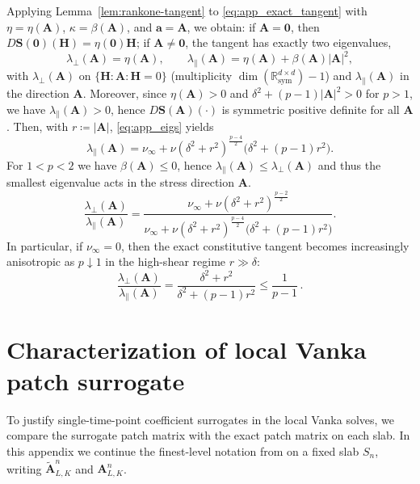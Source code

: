 \documentclass[DIV=16]{scrartcl}
\DeclareMathOperator{\sym}{sym}
\newcommand{\abs}[1]{\left\lvert #1\right\rvert}
\newcommand{\Sstress}{\boldsymbol S} %
\newcommand{\Sn}{S_n}
\newcommand{\reg}{\delta}
\newcommand{\pn}{p}
\newcommand{\etaeff}[1]{\eta \left(#1\right)}
\newcommand{\DStress}[2]{D\Sstress \left(#1\right) \left(#2\right)}
\begin{document}
Applying Lemma~\ref{lem:rankone-tangent} to \eqref{eq:app_exact_tangent} with
$\eta=\etaeff{\bm A}$, $\kappa=\beta(\bm A)$, and $\bm a=\bm A$, we obtain:
if $\bm A=\bm 0$, then $\DStress{\bm 0}{\bm H}=\etaeff{\bm 0}\bm H$; if $\bm A\neq \bm 0$,
the tangent has exactly two eigenvalues,
\begin{equation}\label{eq:app_eigs}
  \lambda_\perp(\bm A)=\etaeff{\bm A},
  \qquad
  \lambda_\parallel(\bm A)=\etaeff{\bm A}+\beta(\bm A)\abs{\bm A}^2,
\end{equation}
with $\lambda_\perp(\bm A)$ on $\{\bm H:\bm A:\bm H=0\}$ (multiplicity $\dim(\mathbb{R}^{d\times d}_{\sym})-1$)
and $\lambda_\parallel(\bm A)$ in the direction $\bm A$.
Moreover, since $\etaeff{\bm A}>0$ and $\reg^2+(\pn-1)\abs{\bm A}^2>0$ for $\pn>1$, we have
$\lambda_\parallel(\bm A)>0$, hence $\DStress{\bm A}{\cdot}$ is symmetric
positive definite for all $\bm A$.
Then, with $r\coloneq \abs{\bm A}$, \eqref{eq:app_eigs} yields
\[
  \lambda_\parallel(\bm A)
  =\nu_{\infty}+\nu(\reg^2+r^2)^{\frac{\pn-4}{2}}\bigl(\reg^2+(\pn-1)r^2\bigr).
\]
For $1<\pn < 2$ we have $\beta(\bm A)\le 0$, hence $\lambda_\parallel(\bm A)\le \lambda_\perp(\bm A)$ and
thus the smallest eigenvalue acts in the stress direction $\bm A$.
\begin{equation}\label{eq:app_ratio}
  \frac{\lambda_\perp(\bm A)}{\lambda_\parallel(\bm A)}
  =\frac{\nu_{\infty}+\nu(\reg^2+r^2)^{\frac{\pn-2}{2}}}
         {\nu_{\infty}+\nu(\reg^2+r^2)^{\frac{\pn-4}{2}}\bigl(\reg^2+(\pn-1)r^2\bigr)}.
\end{equation}
In particular, if $\nu_{\infty}=0$, then the exact constitutive tangent becomes increasingly anisotropic as $\pn\downarrow 1$ in the
high-shear regime $r\gg \reg$:
\begin{equation}\label{eq:app_ratio_nu0}
  \frac{\lambda_\perp(\bm A)}{\lambda_\parallel(\bm A)}
  =\frac{\reg^2+r^2}{\reg^2+(\pn-1)r^2}
  \le \frac{1}{\pn-1}\,.
\end{equation}

\section{Characterization of local Vanka patch surrogate}
\label{app:patch-surrogate}
To justify single-time-point coefficient surrogates in the local Vanka solves,
we compare the surrogate patch matrix with the exact patch matrix on each slab.
In this appendix we continue the finest-level notation from
 on a fixed slab $\Sn$,
writing $\tilde{\bm A}_{L,K}^n$ and $\bm A_{L,K}^n$.
\end{document}
